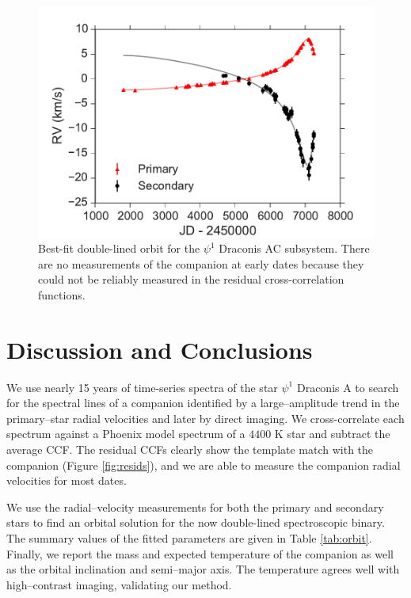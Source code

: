 \documentclass[twocolumn]{emulateapj}
\begin{document}
\begin{figure}

  \includegraphics[width=\columnwidth]{SB2_Orbit.pdf}
  \caption{Best-fit double-lined orbit for the $\psi^1$ Draconis AC subsystem. There are no measurements of the companion at early dates because they could not be reliably measured in the residual cross-correlation functions.}
  \label{fig:orbit}
  
\end{figure}



\section{Discussion and Conclusions}

We use nearly 15 years of time-series spectra of the star $\psi^1$ Draconis A to search for the spectral lines of a companion identified by a large--amplitude trend in the primary--star radial velocities and later by direct imaging. We cross-correlate each spectrum against a Phoenix model spectrum of a $4400$ K star and subtract the average CCF. The residual CCFs clearly show the template match with the companion (Figure \ref{fig:resids}), and we are able to measure the companion radial velocities for most dates. 

We use the radial--velocity measurements for both the primary and secondary stars to find an orbital solution for the now double-lined spectroscopic binary. The summary values of the fitted parameters are given in Table \ref{tab:orbit}. Finally, we report the mass and expected temperature of the companion as well as the orbital inclination and semi--major axis. The temperature agrees well with high--contrast imaging, validating our method.
\end{document}
